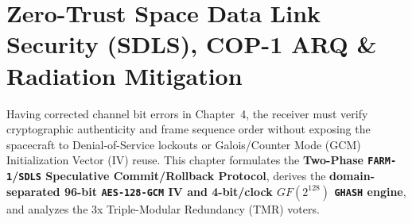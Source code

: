 \documentclass[10pt,a4paper]{article}
\renewcommand{\_}{\origunderscore\penalty0\hskip0pt\relax}
\numberwithin{equation}{section}
\numberwithin{table}{section}
\numberwithin{figure}{section}
\begin{document}
\vspace{6pt}
\section{Zero-Trust Space Data Link Security (SDLS), COP-1 ARQ \& Radiation Mitigation}

Having corrected channel bit errors in Chapter~4, the receiver must verify cryptographic authenticity and frame sequence order without exposing the spacecraft to Denial-of-Service lockouts or Galois/Counter Mode (GCM) Initialization Vector (IV) reuse. This chapter formulates the \textbf{Two-Phase \texttt{FARM-1}/\texttt{SDLS} Speculative Commit/Rollback Protocol}, derives the \textbf{domain-separated 96-bit \texttt{AES-128-GCM} IV and 4-bit/clock $GF(2^{128})$ \texttt{GHASH} engine}, and analyzes the 3x Triple-Modular Redundancy (TMR) voters.
\end{document}

